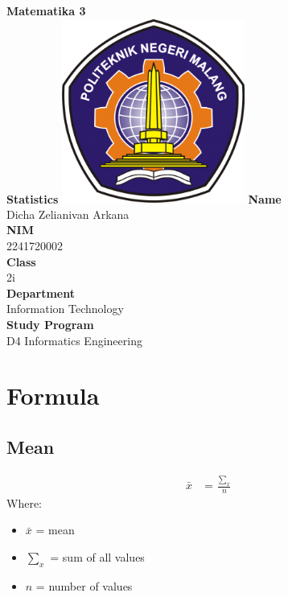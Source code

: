 \documentclass[12pt,titlepage]{article}
\newcommand{\vSubject}{Matematika 3}
\newcommand{\vSubtitle}{Statistics}
\newcommand{\vName}{Dicha Zelianivan Arkana}
\newcommand{\vNIM}{2241720002}
\newcommand{\vClass}{2i}
\newcommand{\vDepartment}{Information Technology}
\newcommand{\vStudyProgram}{D4 Informatics Engineering}
\begin{document}
\begin{titlepage}
    \centering
    \vfill
    {\bfseries\LARGE
        \vSubject\\
        \vskip0.25cm
        \vSubtitle
    }
    \vfill
    \includegraphics[width=6cm]{images/polinema-logo.png}
    \vfill
    {
        \textbf{Name}\\
        \vName\\
        \vskip0.5cm
        \textbf{NIM}\\
        \vNIM\\
        \vskip0.5cm
        \textbf{Class}\\
        \vClass\\
        \vskip0.5cm
        \textbf{Department}\\
        \vDepartment\\
        \vskip0.5cm
        \textbf{Study Program}\\
        \vStudyProgram
    }
\end{titlepage}

\tableofcontents

\pagebreak

\section{Formula}
\subsection{Mean}
\begin{align*}
    \bar{x} &= \frac{\sum_ x}{n}
\end{align*}
Where:
\begin{itemize}
    \item $\bar{x}$ = mean
    \item $\sum_ x$ = sum of all values
    \item $n$ = number of values
\end{itemize}
\end{document}
